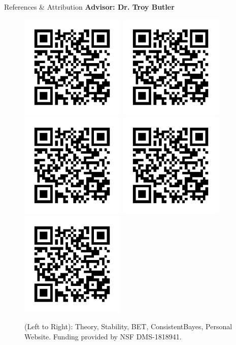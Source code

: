   \begin{block}{\Large References \& Attribution}
    \centering
    \textbf{Advisor: Dr. Troy Butler}
    \begin{figure}
        \includegraphics[width=5cm]{ref1}
        \includegraphics[width=5cm]{ref1}
        \includegraphics[width=5cm]{ref1}
        \includegraphics[width=5cm]{ref1}
        \includegraphics[width=5cm]{ref1}
    \caption*{\centering (Left to Right): Theory, Stability, BET, ConsistentBayes, Personal Website. \newline Funding provided by NSF DMS-1818941.}
    \end{figure}
   

  

  \end{block}

